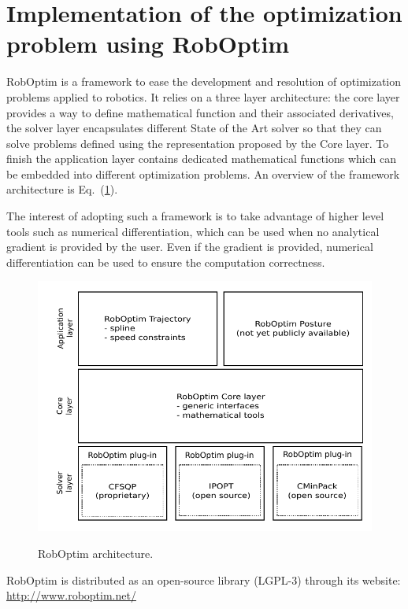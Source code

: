 \documentclass[letterpaper, 10 pt, conference]{ieeeconf}  %
\begin{document}
\section{Implementation of the optimization problem using RobOptim}
\label{sec:implementation}

RobOptim is a framework to ease the development and resolution of
optimization problems applied to robotics. It relies on a three layer
architecture: the core layer provides a way to define mathematical
function and their associated derivatives, the solver layer encapsulates
different State of the Art solver so that they can solve problems
defined using the representation proposed by the Core layer. To finish
the application layer contains dedicated mathematical functions which
can be embedded into different optimization problems. An overview of
the framework architecture is Eq.~(\ref{fig:roboptim}).


The interest of adopting such a framework is to take advantage of
higher level tools such as numerical differentiation, which can be
used when no analytical gradient is provided by the user. Even if the
gradient is provided, numerical differentiation can be used to ensure
the computation correctness.


\begin{figure}[htbp!]
  \includegraphics[width=\linewidth]{figure/roboptim-architecture.pdf}
  \label{fig:roboptim}
  \caption{RobOptim  architecture.}
\end{figure}


RobOptim is distributed as an open-source library (\mbox{LGPL-3}) through its
website: \url{http://www.roboptim.net/}
\end{document}
